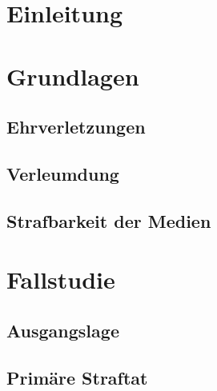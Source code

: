 \documentclass[a4paper, 11pt] {article}
\begin{document}
{}	%
\section*{Einleitung}



\newpage

\section{Grundlagen}

\subsection{Ehrverletzungen}



\subsection{Verleumdung}



\subsection{Strafbarkeit der Medien}





\newpage

\section{Fallstudie}

\subsection{Ausgangslage}



\subsection{Primäre Straftat}
\end{document}
